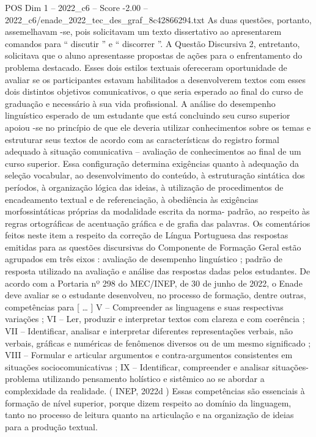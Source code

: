\begin{textsample}{POS Dim 1 – 2022\_c6 – Score -2.00 – 2022\_c6/enade\_2022\_tec\_des\_graf\_8c42866294.txt}
As duas questões, portanto, assemelhavam -se, pois solicitavam um texto dissertativo ao apresentarem comandos para “ discutir ” e “ discorrer ”.
A Questão Discursiva 2, entretanto, solicitava que o aluno apresentasse propostas de ações para o enfrentamento do problema destacado.
Esses dois estilos textuais ofereceram oportunidade de avaliar se os participantes estavam habilitados a desenvolverem textos com esses dois distintos objetivos comunicativos, o que seria esperado ao final do curso de graduação e necessário à sua vida profissional.
A análise do desempenho linguístico esperado de um estudante que está concluindo seu curso superior apoiou -se no princípio de que ele deveria utilizar conhecimentos sobre os temas e estruturar seus textos de acordo com as características do registro formal adequado à situação comunicativa – avaliação de conhecimentos ao final de um curso superior.
Essa configuração determina exigências quanto à adequação da seleção vocabular, ao desenvolvimento do conteúdo, à estruturação sintática dos períodos, à organização lógica das ideias, à utilização de procedimentos de encadeamento textual e de referenciação, à obediência às exigências morfossintáticas próprias da modalidade escrita da norma- padrão, ao respeito às regras ortográficas de acentuação gráfica e de grafia das palavras.
Os comentários feitos neste item a respeito da correção de Língua Portuguesa das respostas emitidas para as questões discursivas do Componente de Formação Geral estão agrupados em três eixos : avaliação de desempenho linguístico ; padrão de resposta utilizado na avaliação e análise das respostas dadas pelos estudantes.
De acordo com a Portaria nº 298 do MEC/INEP, de 30 de junho de 2022, o Enade deve avaliar se o estudante desenvolveu, no processo de formação, dentre outras, competências para [ … ] V – Compreender as linguagens e suas respectivas variações ; VI – Ler, produzir e interpretar textos com clareza e com coerência ; VII – Identificar, analisar e interpretar diferentes representações verbais, não verbais, gráficas e numéricas de fenômenos diversos ou de um mesmo significado ; VIII – Formular e articular argumentos e contra-argumentos consistentes em situações sociocomunicativas ; IX – Identificar, compreender e analisar situações-problema utilizando pensamento holístico e sistêmico ao se abordar a complexidade da realidade. ( INEP, 2022d ) Essas competências são essenciais à formação de nível superior, porque dizem respeito ao domínio da linguagem, tanto no processo de leitura quanto na articulação e na organização de ideias para a produção textual.

\end{textsample}
